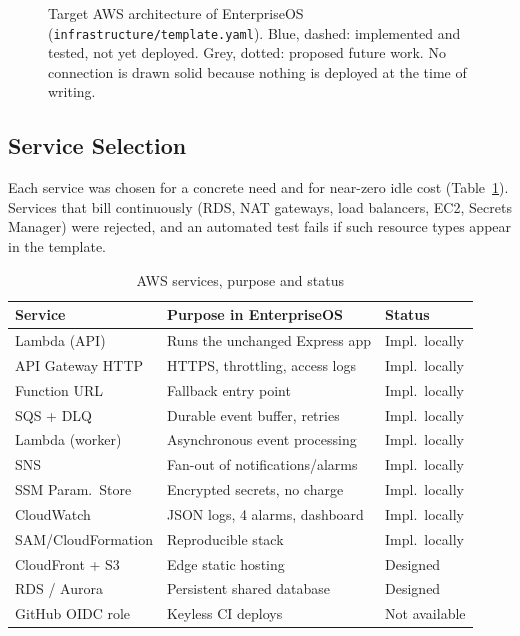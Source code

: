 \documentclass[conference]{IEEEtran}
\newcommand{\code}[1]{\texttt{\small #1}}
\begin{document}
\begin{figure}[t]
{%
}
\caption{Target AWS architecture of EnterpriseOS (\code{infrastructure/template.yaml}). Blue,
dashed: implemented and tested, not yet deployed. Grey, dotted: proposed future work. No
connection is drawn solid because nothing is deployed at the time of writing.}
\label{fig:arch}
\end{figure}

\subsection{Service Selection}
Each service was chosen for a concrete need and for near-zero idle cost
(Table~\ref{tab:services}). Services that bill continuously (RDS, NAT gateways, load
balancers, EC2, Secrets Manager) were rejected, and an automated test fails if such resource
types appear in the template.

\begin{table}[t]
\caption{AWS services, purpose and status}
\label{tab:services}
\centering
\footnotesize
\begin{tabularx}{\columnwidth}{@{}l X l@{}}
\toprule
Service & Purpose in EnterpriseOS & Status \\
\midrule
Lambda (API) & Runs the unchanged Express app & Impl.\ locally \\
API Gateway HTTP & HTTPS, throttling, access logs & Impl.\ locally \\
Function URL & Fallback entry point & Impl.\ locally \\
SQS + DLQ & Durable event buffer, retries & Impl.\ locally \\
Lambda (worker) & Asynchronous event processing & Impl.\ locally \\
SNS & Fan-out of notifications/alarms & Impl.\ locally \\
SSM Param.\ Store & Encrypted secrets, no charge & Impl.\ locally \\
CloudWatch & JSON logs, 4 alarms, dashboard & Impl.\ locally \\
SAM/CloudFormation & Reproducible stack & Impl.\ locally \\
CloudFront + S3 & Edge static hosting & Designed \\
RDS / Aurora & Persistent shared database & Designed \\
GitHub OIDC role & Keyless CI deploys & Not available \\
\bottomrule
\end{tabularx}
\end{table}
\end{document}
